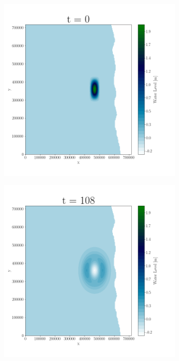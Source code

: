 
\begin{figure}[H]
\centering
\begin{subfigure}[b]{.4\linewidth}
\includegraphics[width=\linewidth]{Figures/4-1.png}
\caption{}
\end{subfigure}
\begin{subfigure}[b]{.4\linewidth}
\includegraphics[width=\linewidth]{Figures/4-2.png}
\caption{}
\end{subfigure}


\end{figure}
